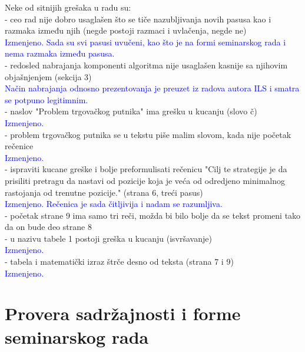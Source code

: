 \documentclass[a4paper]{report}
\newcommand{\odgovor}[1]{\textcolor{blue}{#1}}
\begin{document}
Neke od sitnijih grešaka u radu su: \\
- ceo rad nije dobro usaglašen što se tiče nazubljivanja novih pasusa kao i razmaka između njih (negde postoji razmaci i uvlačenja, negde ne)\\
\odgovor{Izmenjeno. Sada su svi pasusi uvučeni, kao što je na formi seminarskog rada i nema razmaka između pasusa.\\}
- redosled nabrajanja komponenti algoritma nije usaglašen kasnije sa njihovim objašnjenjem  (sekcija 3)\\
\odgovor{Način nabrajanja odnosno prezentovanja je preuzet iz radova autora ILS i smatra se potpuno legitimnim.\\}
- naslov "Problem trgovačkog putnika" ima grešku u kucanju (slovo č)\\
\odgovor{Izmenjeno.\\}
- problem trgovačkog putnika se u tekstu piše malim slovom, kada nije početak rečenice\\
\odgovor{Izmenjeno.\\}
- ispraviti kucane greške i bolje preformulisati rečenicu "Cilj te strategije je da prisiliti pretragu da nastavi od pozicije koja je veća od odredjeno minimalnog rastojanja od trenutne pozicije." (strana 6, treći pasus)\\
\odgovor{Izmenjeno. Rečenica je sada čitljivija i nadam se razumljiva.\\}
- početak strane 9 ima samo tri reči, možda bi bilo bolje da se tekst promeni tako da on bude deo strane 8\\
- u nazivu tabele 1 postoji greška u kucanju (isvršavanje)\\
\odgovor{Izmenjeno.\\}
- tabela i matematički izraz štrče desno od teksta (strana 7 i 9)\\
\odgovor{Izmenjeno.\\}



\section{Provera sadržajnosti i forme seminarskog rada}
\end{document}
